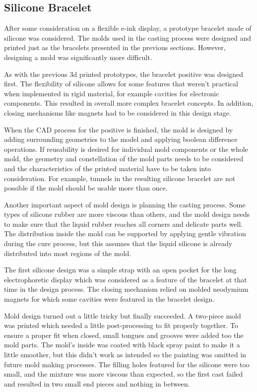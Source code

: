 \subsection{Silicone Bracelet}

After some consideration on a flexible e-ink display, a prototype bracelet made of silicone was considered. The molds used in the casting process were designed and printed just as the bracelets presented in the previous sections. However, designing a mold was significantly more difficult.

As with the previous 3d printed prototypes, the bracelet positive was designed first. The flexibility of silicone allows for some features that weren't practical when implemented in rigid material, for example cavities for electronic components. This resulted in overall more complex bracelet concepts. In addition, closing mechanisms like magnets had to be considered in this design stage.

When the \ac{CAD} process for the positive is finished, the mold is designed by adding surrounding geometries to the model and applying boolean difference operations. If reusability is desired for individual mold components or the whole mold, the geometry and constellation of the mold parts needs to be considered and the characteristics of the printed material have to be taken into consideration. For example, tunnels in the resulting silicone bracelet are not possible if the mold should be usable more than once.

Another important aspect of mold design is planning the casting process. Some types of silicone rubber are more viscous than others, and the mold design needs to make sure that the liquid rubber reaches all corners and delicate parts well. The distribution inside the mold can be supported by applying gentle vibration during the cure process, but this assumes that the liquid silicone is already distributed into most regions of the mold.

The first silicone design was a simple strap with an open pocket for the long electrophoretic display which was considered as a feature of the bracelet at that time in the design process. The closing mechanism relied on molded neodymium magnets for which some cavities were featured in the bracelet design.

Mold design turned out a little tricky but finally succeeded. A two-piece mold was printed which needed a little post-processing to fit properly together. To ensure a proper fit when closed, small tongues and grooves were added too the mold parts. The mold's inside was coated with black spray paint to make it a little smoother, but this didn't work as intended so the painting was omitted in future mold making processes. The filling holes featured for the silicone were too small, and the mixture was more viscous than expected, so the first cast failed and resulted in two small end pieces and nothing in between.

